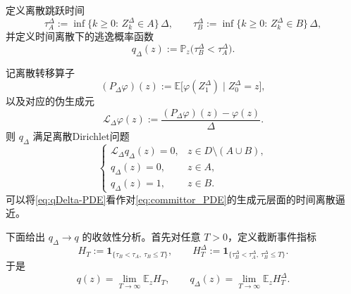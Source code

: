 	定义离散跳跃时间
	\begin{equation}\label{eq:disc-tau}
		\tau_A^\Delta := \inf\{k\ge0:\,Z_k^\Delta\in A\}\,\Delta,\qquad
		\tau_B^\Delta := \inf\{k\ge0:\,Z_k^\Delta\in B\}\,\Delta,
	\end{equation}
	并定义时间离散下的逃逸概率函数
	\begin{equation}\label{eq:qDelta-def}
		q_\Delta(z) := \mathbb{P}_z\big(\tau_B^\Delta < \tau_A^\Delta\big).
	\end{equation}
	
	记离散转移算子
	\[
	(P_\Delta\varphi)(z) := \mathbb{E}\big[\varphi(Z_1^\Delta)\mid Z_0^\Delta=z\big],
	\]
	以及对应的伪生成元
	\begin{equation}\label{eq:LDelta-def}
		\mathcal{L}_\Delta\varphi(z) := \frac{(P_\Delta\varphi)(z)-\varphi(z)}{\Delta}.
	\end{equation}
	则 \(q_\Delta\) 满足离散Dirichlet问题
	\begin{equation}\label{eq:qDelta-PDE}
		\begin{cases}
			\mathcal{L}_\Delta q_\Delta(z) = 0, & z\in D\setminus(A\cup B),\\
			q_\Delta(z) = 0, & z\in A,\\
			q_\Delta(z) = 1, & z\in B.
		\end{cases}
	\end{equation}
	可以将\eqref{eq:qDelta-PDE}看作对\eqref{eq:committor_PDE}的生成元层面的时间离散逼近。
	
	下面给出 \(q_\Delta\to q\) 的收敛性分析。首先对任意 \(T>0\)，定义截断事件指标
	\[
	H_T := \mathbf{1}_{\{\tau_B<\tau_A,\ \tau_B\le T\}},\qquad
	H_T^\Delta := \mathbf{1}_{\{\tau_B^\Delta<\tau_A^\Delta,\ \tau_B^\Delta\le T\}}.
	\]
	于是
	\[
	q(z) = \lim_{T\to\infty} \mathbb{E}_z H_T,\qquad
	q_\Delta(z) = \lim_{T\to\infty} \mathbb{E}_z H_T^\Delta.
	\]
	
